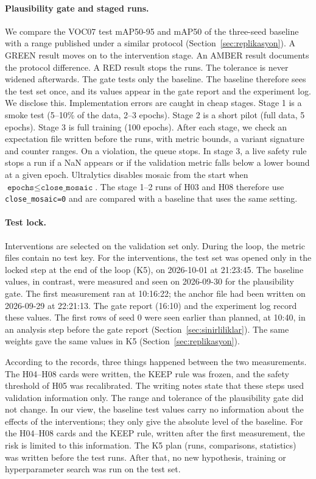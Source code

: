 \documentclass[pdflatex,iicol,sn-mathphys-num]{sn-jnl}
\begin{document}
\paragraph{Plausibility gate and staged runs.}
We compare the VOC07 test mAP50-95 and mAP50 of the three-seed baseline with a range published under a similar protocol (Section~\ref{sec:replikasyon}). A GREEN result moves on to the intervention stage. An AMBER result documents the protocol difference. A RED result stops the runs. The tolerance is never widened afterwards. The gate tests only the baseline. The baseline therefore sees the test set once, and its values appear in the gate report and the experiment log. We disclose this. Implementation errors are caught in cheap stages. Stage 1 is a smoke test (5--10\% of the data, 2--3 epochs). Stage 2 is a short pilot (full data, 5 epochs). Stage 3 is full training (100 epochs). After each stage, we check an expectation file written before the runs, with metric bounds, a variant signature and counter ranges. On a violation, the queue stops. In stage 3, a live safety rule stops a run if a NaN appears or if the validation metric falls below a lower bound at a given epoch. Ultralytics disables mosaic from the start when $\texttt{epochs}\le\texttt{close\_mosaic}$. The stage 1--2 runs of H03 and H08 therefore use \texttt{close\_mosaic=0} and are compared with a baseline that uses the same setting.

\paragraph{Test lock.}
Interventions are selected on the validation set only. During the loop, the metric files contain no test key. For the interventions, the test set was opened only in the locked step at the end of the loop (K5), on 2026-10-01 at 21:23:45. The baseline values, in contrast, were measured and seen on 2026-09-30 for the plausibility gate. The first measurement ran at 10:16:22; the anchor file had been written on 2026-09-29 at 22:21:13. The gate report (16:10) and the experiment log record these values. The first rows of seed 0 were seen earlier than planned, at 10:40, in an analysis step before the gate report (Section~\ref{sec:sinirliliklar}). The same weights gave the same values in K5 (Section~\ref{sec:replikasyon}).

According to the records, three things happened between the two measurements. The H04--H08 cards were written, the KEEP rule was frozen, and the safety threshold of H05 was recalibrated. The writing notes state that these steps used validation information only. The range and tolerance of the plausibility gate did not change. In our view, the baseline test values carry no information about the effects of the interventions; they only give the absolute level of the baseline. For the H04--H08 cards and the KEEP rule, written after the first measurement, the risk is limited to this information. The K5 plan (runs, comparisons, statistics) was written before the test runs. After that, no new hypothesis, training or hyperparameter search was run on the test set.
\end{document}
